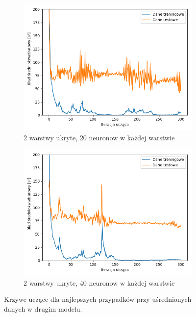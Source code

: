 \documentclass[12pt]{aghdpl}
\begin{document}
\begin{figure}[h]
		 	\begin{subfigure}{.5\linewidth}
		 		\includegraphics[width =\linewidth]{wykresy/5_usrednianie_danych/2_warstwy_20_neuronow_wykres_uczenia.png}
		 		\caption{2 warstwy ukryte, 20 neuronow w każdej warstwie}
		 	\end{subfigure}
		 	\begin{subfigure}{.5\linewidth}
		 		\includegraphics[width =\linewidth]{wykresy/5_usrednianie_danych/2_warstwy_40_neuronow_wykres_uczenia.png}
		 		\caption{2 warstwy ukryte, 40 neuronow w każdej warstwie}
		 	\end{subfigure}
	 	
 			\caption{Krzywe uczące dla najlepszych przypadków przy uśrednionych danych w drugim modelu.}
			\label{fig: drugi_model_przy_usrednionych_danych_wykresy_uczenia}
		\end{figure}
		
\end{document}
